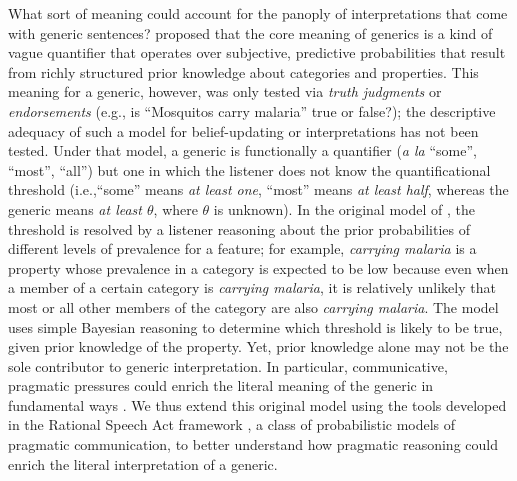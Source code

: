 \documentclass[floatsintext,doc]{apa6}
\newcommand{\mht}[1]{{\textcolor{Blue}{[mht: #1]}}}
\begin{document}
What sort of meaning could account for the panoply of interpretations that come with generic sentences?
 proposed that the core meaning of generics is a kind of vague quantifier that operates over subjective, predictive probabilities that result from richly structured prior knowledge about categories and properties. 
This meaning for a generic, however, was only tested via \emph{truth judgments} or \emph{endorsements} (e.g., is \enquote{Mosquitos carry malaria} true or false?); the descriptive adequacy of such a model for belief-updating or interpretations has not been tested.
Under that model, a generic is functionally a quantifier (\emph{a la} ``some'', ``most'', ``all'') but one in which the listener does not know the quantificational threshold (i.e.,``some'' means \emph{at least one},  ``most'' means \emph{at least half}, whereas the generic means \emph{at least $\theta$}, where $\theta$ is unknown).
In the original model of , the threshold is resolved by a listener reasoning about the prior probabilities of different levels of prevalence for a feature; for example, \emph{carrying malaria} is a property whose prevalence in a category is expected to be low because even when a member of a certain category is \emph{carrying malaria}, it is relatively unlikely that most or all other members of the category are also \emph{carrying malaria}.
The model uses simple Bayesian reasoning to determine which threshold is likely to be true, given  prior knowledge of the property. 
Yet, prior knowledge alone may not be the sole contributor to generic interpretation. 
In particular, communicative, pragmatic pressures could enrich the literal meaning of the generic in fundamental ways \cite{declerck1986manifold}.
We thus extend this original model using the tools developed in the Rational Speech Act framework \cite{Frank2012, Goodman2016, problang}, a class of probabilistic models of pragmatic communication, to better understand how pragmatic reasoning could enrich the literal interpretation of a generic.

%
%
%

\end{document}
